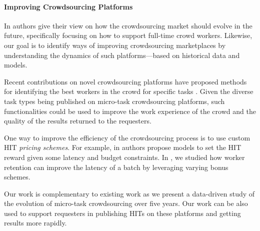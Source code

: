 
\paragraph{Improving Crowdsourcing Platforms}
In \cite{Kittur:2013:FCW:2441776.2441923} authors give their view on how the crowdsourcing market should evolve in the future, specifically focusing on how to support full-time crowd workers. 
Likewise, our goal is to identify ways of improving crowdsourcing marketplaces by understanding the dynamics of such platforms---based on historical data and models.

Recent contributions on novel crowdsourcing platforms have proposed methods for identifying the best workers in the crowd for specific tasks \cite{pickacrowd,bozzon}. Given the diverse task types being published on micro-task crowdsourcing platforms, such functionalities could be used to improve the work experience of the crowd and the quality of the results returned to the requesters.

One way to improve the efficiency of the crowdsourcing process is to use custom HIT \emph{pricing schemes}. For example, in \cite{finishthem} authors propose models to set the HIT reward given some latency and budget constraints. In \cite{scaleup}, we studied how worker retention can improve the latency of a batch by leveraging varying bonus schemes.

Our work is complementary to existing work as we present a data-driven study of the evolution of micro-task crowdsourcing over five years.
Our work can be also used to support requesters in publishing HITs on these platforms and getting results more rapidly.




